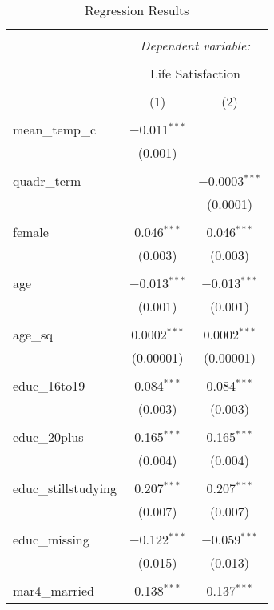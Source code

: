 
\begin{table}[!htbp] \centering 
  \caption{Regression Results} 
  \label{} 
\begin{tabular}{@{\extracolsep{5pt}}lcc} 
\\[-1.8ex]\hline 
\hline \\[-1.8ex] 
 & \multicolumn{2}{c}{\textit{Dependent variable:}} \\ 
\cline{2-3} 
\\[-1.8ex] & \multicolumn{2}{c}{Life Satisfaction} \\ 
\\[-1.8ex] & (1) & (2)\\ 
\hline \\[-1.8ex] 
 mean\_temp\_c & $-$0.011$^{***}$ &  \\ 
  & (0.001) &  \\ 
  & & \\ 
 quadr\_term &  & $-$0.0003$^{***}$ \\ 
  &  & (0.0001) \\ 
  & & \\ 
 female & 0.046$^{***}$ & 0.046$^{***}$ \\ 
  & (0.003) & (0.003) \\ 
  & & \\ 
 age & $-$0.013$^{***}$ & $-$0.013$^{***}$ \\ 
  & (0.001) & (0.001) \\ 
  & & \\ 
 age\_sq & 0.0002$^{***}$ & 0.0002$^{***}$ \\ 
  & (0.00001) & (0.00001) \\ 
  & & \\ 
 educ\_16to19 & 0.084$^{***}$ & 0.084$^{***}$ \\ 
  & (0.003) & (0.003) \\ 
  & & \\ 
 educ\_20plus & 0.165$^{***}$ & 0.165$^{***}$ \\ 
  & (0.004) & (0.004) \\ 
  & & \\ 
 educ\_stillstudying & 0.207$^{***}$ & 0.207$^{***}$ \\ 
  & (0.007) & (0.007) \\ 
  & & \\ 
 educ\_missing & $-$0.122$^{***}$ & $-$0.059$^{***}$ \\ 
  & (0.015) & (0.013) \\ 
  & & \\ 
 mar4\_married & 0.138$^{***}$ & 0.137$^{***}$ \\ 

\end{tabular}
\end{table}

